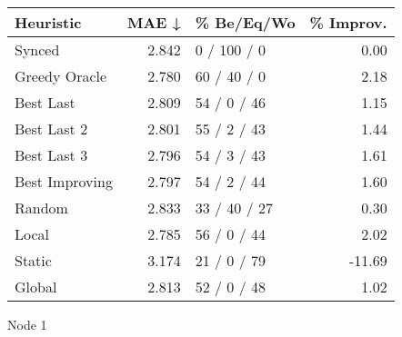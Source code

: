 \begin{tabular}{lrlr}
\toprule
\textbf{Heuristic} & \textbf{MAE ↓} & \textbf{\% Be/Eq/Wo} & \textbf{\% Improv.} \\
\midrule
            Synced &          2.842 &          0 / 100 / 0 &                0.00 \\
     Greedy Oracle &          2.780 &          60 / 40 / 0 &                2.18 \\
         Best Last &          2.809 &          54 / 0 / 46 &                1.15 \\
       Best Last 2 &          2.801 &          55 / 2 / 43 &                1.44 \\
       Best Last 3 &          2.796 &          54 / 3 / 43 &                1.61 \\
    Best Improving &          2.797 &          54 / 2 / 44 &                1.60 \\
            Random &          2.833 &         33 / 40 / 27 &                0.30 \\
             Local &          2.785 &          56 / 0 / 44 &                2.02 \\
            Static &          3.174 &          21 / 0 / 79 &              -11.69 \\
            Global &          2.813 &          52 / 0 / 48 &                1.02 \\
\bottomrule
\end{tabular}
\caption{Node 1}
\label{tab:ds_non_lr01_le2_bs2_1}
